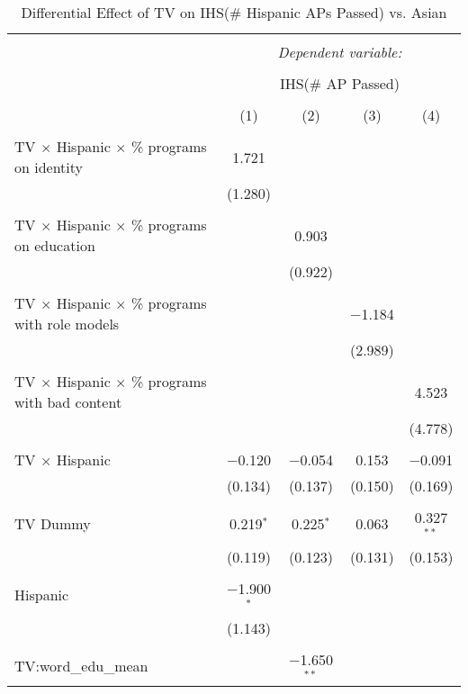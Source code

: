 
\begin{table}[!htbp] \centering 
  \caption{Differential Effect of TV on IHS(\# Hispanic APs Passed) vs. Asian} 
  \label{} 
\begin{tabular}{@{\extracolsep{-2pt}}lcccc} 
\\[-1.8ex]\hline 
\hline \\[-1.8ex] 
 & \multicolumn{4}{c}{\textit{Dependent variable:}} \\ 
\cline{2-5} 
\\[-1.8ex] & \multicolumn{4}{c}{IHS(\# AP Passed)} \\ 
\\[-1.8ex] & (1) & (2) & (3) & (4)\\ 
\hline \\[-1.8ex] 
 TV $\times$ Hispanic $\times$ \% programs on identity & 1.721 &  &  &  \\ 
  & (1.280) &  &  &  \\ 
  & & & & \\ 
 TV $\times$ Hispanic $\times$ \% programs on education &  & 0.903 &  &  \\ 
  &  & (0.922) &  &  \\ 
  & & & & \\ 
 TV $\times$ Hispanic $\times$ \% programs with role models &  &  & $-$1.184 &  \\ 
  &  &  & (2.989) &  \\ 
  & & & & \\ 
 TV $\times$ Hispanic $\times$ \% programs with bad content &  &  &  & 4.523 \\ 
  &  &  &  & (4.778) \\ 
  & & & & \\ 
 TV $\times$ Hispanic & $-$0.120 & $-$0.054 & 0.153 & $-$0.091 \\ 
  & (0.134) & (0.137) & (0.150) & (0.169) \\ 
  & & & & \\ 
 TV Dummy & 0.219$^{*}$ & 0.225$^{*}$ & 0.063 & 0.327$^{**}$ \\ 
  & (0.119) & (0.123) & (0.131) & (0.153) \\ 
  & & & & \\ 
 Hispanic & $-$1.900$^{*}$ &  &  &  \\ 
  & (1.143) &  &  &  \\ 
  & & & & \\ 
 TV:word\_edu\_mean &  & $-$1.650$^{**}$ &  &  \\ 

\end{tabular}
\end{table}
